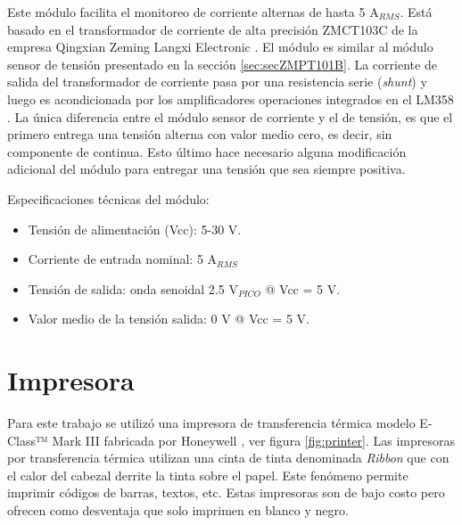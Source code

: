 Este módulo facilita el monitoreo de corriente alternas de hasta 5 A$_{RMS}$. Está basado en el transformador de corriente de alta precisión ZMCT103C de la empresa Qingxian Zeming Langxi Electronic \citep{ZMCT103C_b}. El módulo es similar al módulo sensor de tensión presentado en la sección \ref{sec:secZMPT101B}. La corriente de salida del transformador de corriente pasa por una resistencia serie (\textit{shunt}) y luego es acondicionada por los amplificadores operaciones integrados en el LM358 \citep{LM358}. La única diferencia entre el módulo sensor de corriente y el de tensión, es que el primero entrega una tensión alterna con valor medio cero, es decir, sin componente de continua. Esto último hace necesario alguna modificación adicional del módulo para entregar una tensión que sea siempre positiva.

Especificaciones técnicas del módulo: 
\begin{itemize}
\item Tensión de alimentación (Vcc): 5-30 V.
\item Corriente de entrada nominal: 5 A$_{RMS}$
\item Tensión de salida: onda senoidal 2.5 V$_{PICO}$ @ Vcc = 5 V.
\item Valor medio de la tensión salida: 0 V @ Vcc = 5 V.
\end{itemize}

\section{Impresora}

Para este trabajo se utilizó una impresora de transferencia térmica modelo E-Class™ Mark III fabricada por Honeywell \citep{printer_b}, ver figura \ref{fig:printer}. Las impresoras por transferencia térmica utilizan una cinta de tinta denominada \textit{Ribbon} que con el calor del cabezal derrite la tinta sobre el papel. Este fenómeno permite imprimir códigos de barras, textos, etc. Estas impresoras son de bajo costo pero ofrecen como desventaja que solo imprimen en blanco y negro.

